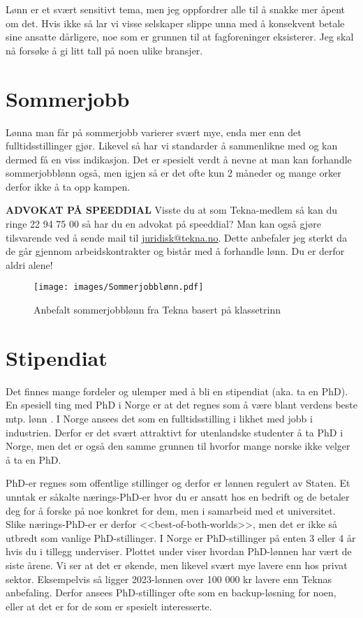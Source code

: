 Lønn er et svært sensitivt tema, men jeg oppfordrer alle til å snakke mer åpent om det. Hvis ikke så lar vi visse selskaper slippe unna med å konsekvent betale sine ansatte dårligere, noe som er grunnen til at fagforeninger eksisterer. Jeg skal nå forsøke å gi litt tall på noen ulike bransjer.



\section{Sommerjobb}

Lønna man får på sommerjobb varierer svært mye, enda mer enn det fulltidsstillinger gjør. Likevel så har vi standarder å sammenlikne med og kan dermed få en viss indikasjon. Det er spesielt verdt å nevne at man kan forhandle sommerjobblønn også, men igjen så er det ofte kun 2 måneder og mange orker derfor ikke å ta opp kampen.

\begin{remark}
    \textbf{ADVOKAT PÅ SPEEDDIAL} Visste du at som Tekna-medlem så kan du ringe 22 94 75 00 så har du en advokat på speeddial? Man kan også gjøre tilsvarende ved å sende mail til \url{juridisk@tekna.no}. Dette anbefaler jeg sterkt da de går gjennom arbeidskontrakter og bistår med å forhandle lønn. Du er derfor aldri alene!
\end{remark}

\begin{figure}[H]
    \centering
    \texttt{[image: images/Sommerjobblønn.pdf]}
    \caption{Anbefalt sommerjobblønn fra Tekna basert på klassetrinn}
\end{figure}



\section{Stipendiat}

Det finnes mange fordeler og ulemper med å bli en stipendiat (aka. ta en PhD). En spesiell ting med PhD i Norge er at det regnes som å være blant verdens beste mtp. lønn \cite{phd_salary_academiainsider}. I Norge ansees det som en fulltidsstilling i likhet med jobb i industrien. Derfor er det svært attraktivt for utenlandske studenter å ta PhD i Norge, men det er også den samme grunnen til hvorfor mange norske ikke velger å ta en PhD.

PhD-er regnes som offentlige stillinger og derfor er lønnen regulert av Staten. Et unntak er såkalte nærings-PhD-er hvor du er ansatt hos en bedrift og de betaler deg for å forske på noe konkret for dem, men i samarbeid med et universitet. Slike nærings-PhD-er er derfor <<best-of-both-worlds>>, men det er ikke så utbredt som vanlige PhD-stillinger. I Norge er PhD-stillinger på enten 3 eller 4 år hvis du i tillegg underviser. Plottet under viser hvordan PhD-lønnen har vært de siste årene. Vi ser at det er økende, men likevel svært mye lavere enn hos privat sektor. Eksempelvis så ligger 2023-lønnen over 100 000 kr lavere enn Teknas anbefaling. Derfor ansees PhD-stillinger ofte som en backup-løsning for noen, eller at det er for de som er spesielt interesserte.  

